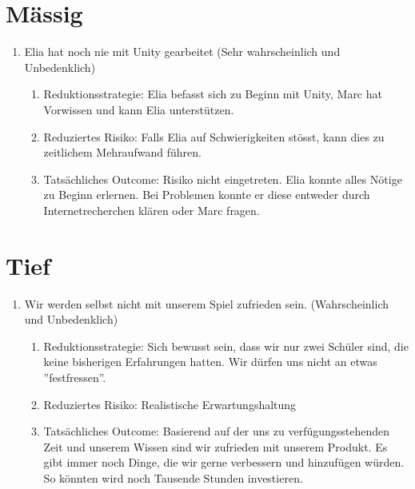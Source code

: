 \begin{enumerate}
\end{enumerate}

\section{Mässig}
\begin{enumerate}
    \item Elia hat noch nie mit Unity gearbeitet (Sehr wahrscheinlich und Unbedenklich)
    \begin{enumerate}
        \item Reduktionsstrategie: Elia befasst sich zu Beginn mit Unity, Marc hat Vorwissen und kann Elia unterstützen.
        \item Reduziertes Risiko: Falls Elia auf Schwierigkeiten stösst, kann dies zu zeitlichem Mehraufwand führen.
        \item Tatsächliches Outcome: Risiko nicht eingetreten. Elia konnte alles Nötige zu Beginn erlernen. Bei Problemen konnte er diese entweder durch Internetrecherchen klären oder Marc fragen. 
    \end{enumerate}
\end{enumerate}

\section{Tief}
\begin{enumerate}
    \item Wir werden selbst nicht mit unserem Spiel zufrieden sein. (Wahrscheinlich und Unbedenklich)
    \begin{enumerate}
        \item Reduktionsstrategie: Sich bewusst sein, dass wir nur zwei Schüler sind, die keine bisherigen Erfahrungen hatten. Wir dürfen uns nicht an etwas ''festfressen''.
        \item Reduziertes Risiko: Realistische Erwartungshaltung
        \item Tatsächliches Outcome: Basierend auf der uns zu verfügungsstehenden Zeit und unserem Wissen sind wir zufrieden mit unserem Produkt. Es gibt immer noch Dinge, die wir gerne verbessern und hinzufügen würden. So könnten wird noch Tausende Stunden investieren.
    \end{enumerate}
\end{enumerate}